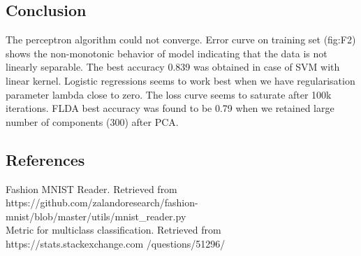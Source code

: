 \documentclass[12pt,journal,compsoc]{IEEEtran}
\begin{document}


\subsection{Conclusion}
\noindent  The perceptron algorithm could not converge. Error curve on training set (fig:F2) shows the non-monotonic behavior of model indicating that the data is not linearly separable. The best accuracy 0.839 was obtained in case of SVM with linear kernel. Logistic regressions seems to work best when we have regularisation parameter lambda close to zero. The loss curve seems to saturate after 100k iterations. FLDA best accuracy was found to be 0.79 when we retained large number of components (300) after PCA.

\subsection{References}

\noindent [1] Fashion MNIST Reader. Retrieved from https://github.com/zalandoresearch/fashion-mnist/blob/master/utils/mnist\_reader.py\\
\noindent [2] Metric for multiclass classification. Retrieved from https://stats.stackexchange.com
/questions/51296/
\end{document}
